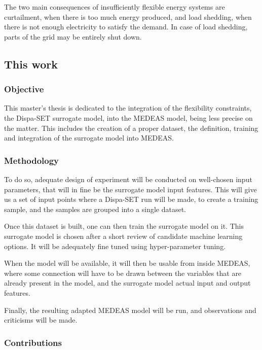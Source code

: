 The two main consequences of insufficiently flexible energy systems are curtailment, when there is too much energy produced, and load shedding, when there is not enough electricity to satisfy the demand. In case of load shedding, parts of the grid may be entirely shut down.

\subsection{This work}

\subsubsection{Objective}

This master's thesis is dedicated to the integration of the flexibility constraints, the Dispa-SET surrogate model, into the MEDEAS model, being less precise on the matter. This includes the creation of a proper dataset, the definition, training and integration of the surrogate model into MEDEAS.

\subsubsection{Methodology}

To do so, adequate design of experiment will be conducted on well-chosen input parameters, that will in fine be the surrogate model input features. This will give us a set of input points where a Dispa-SET run will be made, to create a training sample, and the samples are grouped into a single dataset.

Once this dataset is built, one can then train the surrogate model on it. This surrogate model is chosen after a short review of candidate machine learning options. It will be adequately fine tuned using hyper-parameter tuning.

When the model will be available, it will then be usable from inside MEDEAS, where some connection will have to be drawn between the variables that are already present in the model, and the surrogate model actual input and output features.

Finally, the resulting adapted MEDEAS model will be run, and observations and criticisms will be made.

\subsubsection{Contributions}

